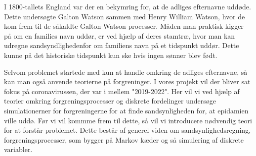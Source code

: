 I 1800-tallets England var der en bekymring for, at de adliges efternavne uddøde. Dette undersøgte Galton Watson sammen med Henry William Watson, hvor de kom frem til de såkaldte Galton-Watson processer. Måden man praktisk kigger på om en families navn uddør, er ved hjælp af deres stamtræ, hvor man kan udregne sandsyndlighedenfor om familiens navn på et tidspunkt uddør. Dette kunne på det historiske tidspunkt kun ske hvis ingen sønner blev født.

\quad Selvom problemet startede med kun at handle omkring de adliges efternavne, så kan man også anvende teorierne på forgreninger. I vores projekt vil der bliver sat fokus på coronavirussen, der var i mellem "2019-2022". Her vil vi ved hjælp af teorier omkring forgreningsprocesser og diskrete fordelinger undersøge simulationerner for forgreningerne for at finde sandsynligheden for, at epidamien ville uddø. Før vi vil kommme frem til dette, så vil vi introducere  nødvendig teori for at forstår problemet. Dette består af generel viden om sandsynlighedsregning, forgreningsprocesser, som bygger på Markov kæder og så simulering af diskrete variabler. 
